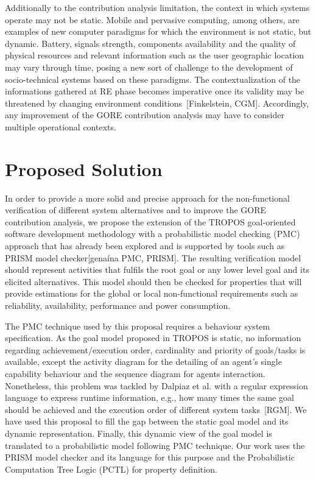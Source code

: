Additionally to the contribution analysis limitation, the context in which systems operate may not be static. Mobile and pervasive computing, among others, are examples of new computer paradigms for which the environment is not static, but dynamic. Battery, signals strength, components availability and the quality of physical resources and relevant information such as the user geographic location may vary through time, posing a new sort of challenge to the development of socio-technical systems based on these paradigms. The contextualization of the informations gathered at RE phase becomes imperative once its validity may be threatened by changing environment conditions~[Finkelstein, CGM]. Accordingly, any improvement of the GORE contribution analysis may have to consider multiple operational contexts.



\section{Proposed Solution}

In order to provide a more solid and precise approach for the non-functional verification of different system alternatives and to improve the GORE contribution analysis, we propose the extension of the TROPOS goal-oriented software development methodology with a probabilistic model checking (PMC) approach that has already been explored and is supported by tools such as PRISM model checker[genaína PMC, PRISM]. The resulting verification model should represent activities that fulfils the root goal or any lower level goal and its elicited alternatives. This model should then be checked for properties that will provide estimations for the global or local non-functional requirements such as reliability, availability, performance and power consumption. 

The PMC technique used by this proposal requires a behaviour system specification. As the goal model proposed in TROPOS is static, no information regarding achievement/execution order, cardinality and priority of goals/tasks is available, except the activity diagram for the detailing of an agent's single capability behaviour and the sequence diagram for agents interaction. Nonetheless, this problem was tackled by Dalpiaz et al. with a regular expression language to express runtime information, e.g., how many times the same goal should be achieved and the execution order of different system tasks~[RGM]. We have used this proposal to fill the gap between the static goal model and its dynamic representation. Finally, this dynamic view of the goal model is translated to a probabilistic model following PMC technique. Our work uses the PRISM model checker and its language for this purpose and the Probabilistic Computation Tree Logic (PCTL) for property definition.

